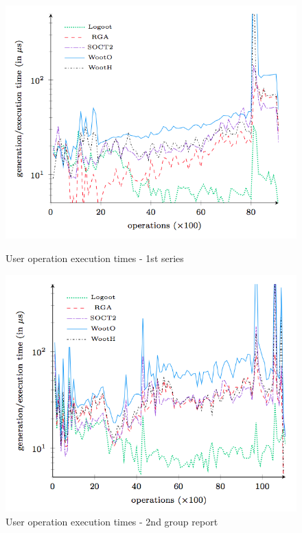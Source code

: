 \begin{figure}
\begin{minipage}{.50\linewidth}
    \includegraphics[width=1.2\textwidth]{includes/users_operations_1t_big.png}
  	\caption{User operation execution times - 1st series}
  	\label{fig:users_operations_1t_big}
\end{minipage} \hfill
\begin{minipage}{0.50\linewidth}
  \includegraphics[width=1.2\textwidth]{includes/users_operations_2g_report.png}
  \caption{User operation execution times - 2nd group
report}
  \label{fig:users_operations_2g_report}
  \end{minipage} \hfill
\end{figure}

